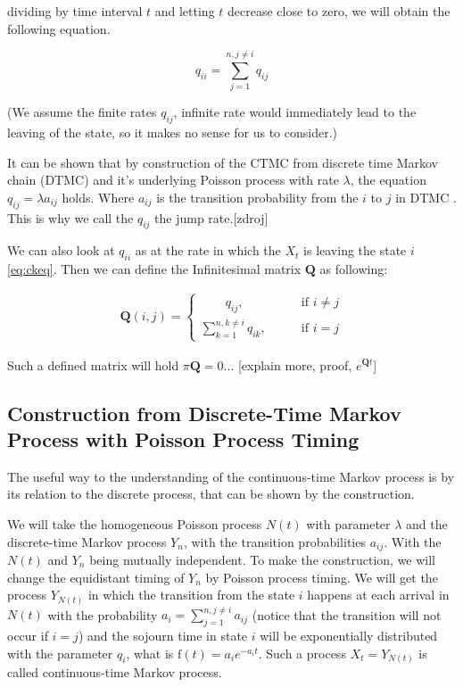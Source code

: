 \documentclass[thesis=M,english]{FITthesis}[2012/10/20]
\newcommand{\matr}[1]{\mathbf{#1}}
\begin{document}
dividing by time interval $t$ and letting $t$ decrease close to zero, we will obtain the following equation. 

\begin{equation}\label{eq:qii}
 q_{ii} =  \sum_{j = 1}^{ n ,j \neq i} q_{ij} 
\end{equation}

(We assume the finite rates $q_{ij}$, infinite rate would immediately lead to the leaving of the state, so it makes no sense for us to consider.)

It can be shown that by construction of the CTMC from discrete time Markov chain (DTMC) and  it's underlying Poisson process with rate $\lambda$, the equation $q_{ij} = \lambda a_{ij}$ holds. Where $a_{ij}$ is the transition probability from the $i$ to $j$ in DTMC \label{eq:tp}. This is why we call the $q_{ij}$ the jump rate.[zdroj]  


We can also look at $q_{ii}$ as at the rate in which the $X_t$ is leaving the state $i$ \eqref{eq:ckeq}. Then we can define the Infinitesimal matrix $\matr{Q}$ as following:

\begin{equation}
\begin{aligned}  
\matr{Q}(i,j)= 
\begin{cases}
\qquad q_{ij}, \qquad & \text{if } i\neq j\\
\sum\limits_{k = 1}^{ n ,k \neq i} q_{ik}, \qquad & \text{if } i=j
\end{cases}
\end{aligned}
\end{equation}

Such a defined matrix will hold $\pi\matr{Q} = 0$... [explain more, proof, $e^{\matr{Q}t}$]

\subsection{Construction from Discrete-Time Markov Process with Poisson Process Timing } 

The useful way to the understanding of the continuous-time Markov process is by its relation to the discrete process, that can be shown by the construction.

We will take the homogeneous Poisson process $N(t)$ with parameter $\lambda$ and the discrete-time Markov process $Y_n$, with the transition probabilities $a_{ij}$. With the $N(t)$ and $Y_n$ being mutually independent. To make the construction, we will change the equidistant timing of $Y_n$ by Poisson process timing. We will get the process $Y_{N(t)}$ in which the transition from the state $i$ happens at each arrival in $N(t)$ with the probability $a_i = \sum_{j = 1}^{ n ,j \neq i} a_{ij}$ (notice that the transition will not occur if $i=j$) and the sojourn time in state $i$ will be exponentially distributed with the parameter $q_i$, what is $\mathrm{f}(t)= a_i e^{-a_i t}$. Such a process $X_t = Y_{N(t)}$ is called continuous-time Markov process.
\end{document}
